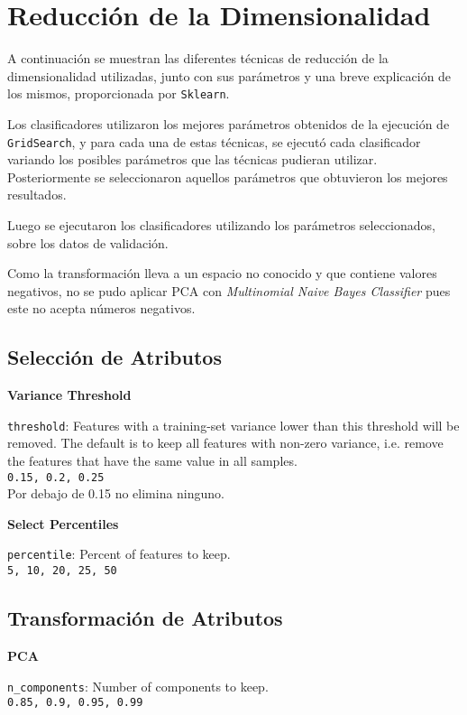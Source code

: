 \section{Reducción de la Dimensionalidad}
A continuaci\'on se muestran las diferentes t\'ecnicas de reducci\'on de la dimensionalidad utilizadas, junto con sus par\'ametros y una breve explicaci\'on de los mismos, proporcionada por \texttt{Sklearn}.

Los clasificadores utilizaron los mejores par\'ametros obtenidos de la ejecuci\'on de \texttt{GridSearch}, y para cada una de estas t\'ecnicas, se ejecut\'o cada clasificador variando los posibles par\'ametros que las t\'ecnicas pudieran utilizar. Posteriormente se seleccionaron aquellos par\'ametros que obtuvieron los mejores resultados.

Luego se ejecutaron los clasificadores utilizando los par\'ametros seleccionados, sobre los datos de validaci\'on.

Como la transformaci\'on lleva a un espacio no conocido y que contiene valores negativos, no se pudo aplicar PCA con \emph{Multinomial Naive Bayes Classifier} pues este no acepta n\'umeros negativos.

\subsection{Selecci\'on de Atributos}
\textbf{Variance Threshold}\par
\texttt{threshold}: Features with a training-set variance lower than this threshold will be removed. The default is to keep all features with non-zero variance, i.e. remove the features that have the same value in all samples. \\
\indent \texttt{0.15, 0.2, 0.25}\\
\indent Por debajo de 0.15 no elimina ninguno.\par
	
\noindent \textbf{Select Percentiles}\par
\texttt{percentile}: Percent of features to keep. \\
\indent \texttt{5, 10, 20, 25, 50}

\subsection{Transformaci\'on de Atributos}
\textbf{PCA}\par
\texttt{n\_components}: Number of components to keep. \\
\indent \texttt{0.85, 0.9, 0.95, 0.99}

